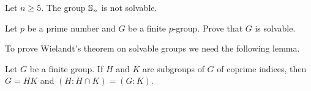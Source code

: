 \begin{example}
	Let $n\geq5$. The group $\mathbb{S}_n$ is  not solvable.
\end{example}


\begin{exercise}
	Let $p$ be a prime number and $G$ be a finite $p$-group. Prove that 
	$G$ is solvable. 
\end{exercise}


%

To prove Wielandt's theorem on solvable groups 
we need the following lemma.  

\begin{lemma}
	\label{lemma:4Wielandt}
	Let $G$ be a finite group. If $H$ and $K$ are subgroups of $G$ of coprime indices, then 
    $G=HK$ and $(H:H\cap K)=(G:K)$.
\end{lemma}

